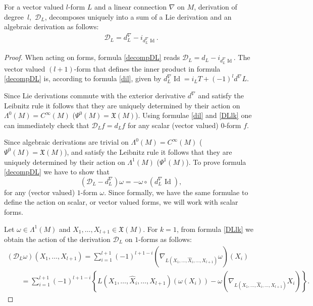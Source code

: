 \begin{Lemma} \label{lem:dec_DL} For a vector valued $l$-form $L$ and a linear connection $\nabla$ on $M$,
derivation of degree~$l$,~${\mathcal D}_L$, decomposes uniquely
into a sum of a Lie derivation and an algebraic derivation
as follows:
\begin{gather}
{\mathcal D}_L= d^{\nabla}_L -
i_{d^{\nabla}_L\operatorname{Id}}.\label{decompDL}
\end{gather}
\end{Lemma}
\begin{proof}
When acting on forms, formula \eqref{decompDL} reads ${\mathcal
D}_L= d_L - i_{d^{\nabla}_L\operatorname{Id}}$. The vector valued
$(l+1)$-form that def\/ines the inner product in formula
\eqref{decompDL} is, according to formula \eqref{dil}, given by
$d^{\nabla}_L\operatorname{Id}=i_LT +(-1)^ld^{\nabla}L.$

Since Lie derivations commute with the exterior
derivative $d^{\nabla}$ and satisfy the Leibnitz rule it follows that
they are uniquely determined by their action on
$\Lambda^0(M)=C^{\infty}(M)$ ($\Psi^0(M)={\mathfrak X}(M)$).
Using formulae \eqref{dil} and \eqref{DLlk} one can immediately
check that ${\mathcal D}_Lf=d_Lf$ for any scalar (vector
valued) $0$-form $f$.

Since algebraic derivations are trivial on
$\Lambda^0(M)=C^{\infty}(M)$ ($\Psi^0(M)={\mathfrak X}(M)$), and
satisfy the Leibnitz rule it follows that they are uniquely determined by
their action on $\Lambda^1(M)$ ($\Psi^1(M)$). To prove formula
\eqref{decompDL} we have to show that
\[
\left({\mathcal D}_L- d^{\nabla}_L\right)\omega = -\omega \circ
\left(d^{\nabla}_L\operatorname{Id}\right),
\]
 for any (vector valued) $1$-form
$\omega$. Since formally, we have the same formulae to def\/ine the
action on scalar, or vector valued forms, we will work with scalar
forms.

Let $\omega \in \Lambda^1(M)$ and $X_1, \dots , X_{l+1} \in
{\mathfrak X}(M)$. For $k=1$, from formula \eqref{DLlk} we obtain
the action of the derivation ${\mathcal D}_L$ on $1$-forms as
follows:
\begin{gather}
 \left({\mathcal D}_L\omega\right)(X_1,\dots , X_{l+1})=
\sum_{i=1}^{l+1}(-1)^{l+1-i}\left(\nabla_{L(X_1,\dots ,
\hat{X}_i,\dots ,X_{l+1})}\omega\right)(X_i) \nonumber  \\
\qquad{}
=  \sum_{i=1}^{l+1}(-1)^{l+1-i} \left\{L(X_1,\dots , \hat{X}_i,\dots ,X_{l+1})
(\omega(X_i)) -\omega\left( \nabla_{L(X_1,\dots ,
\hat{X}_i,\dots ,X_{l+1})} X_i\right)\right\}. \!\!\!\label{eq:dlo1}
\end{gather}


\end{proof}
